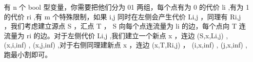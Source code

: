{}有\markdownRendererDollarSign{} n \markdownRendererDollarSign{}个\markdownRendererDollarSign{} bool \markdownRendererDollarSign{}型变量，你需要把他们分为\markdownRendererDollarSign{} 01 \markdownRendererDollarSign{}两组，每个点有为\markdownRendererDollarSign{} 0 \markdownRendererDollarSign{}的代价\markdownRendererDollarSign{} l\markdownRendererUnderscore{}i \markdownRendererDollarSign{},有为\markdownRendererDollarSign{} 1 \markdownRendererDollarSign{}的代价\markdownRendererDollarSign{} r\markdownRendererUnderscore{}i \markdownRendererDollarSign{},有\markdownRendererDollarSign{} m \markdownRendererDollarSign{}个特殊限制，如果\markdownRendererDollarSign{} i,j \markdownRendererDollarSign{}同时在左侧会产生代价\markdownRendererDollarSign{} L\markdownRendererUnderscore{}\markdownRendererLeftBrace{}i,j\markdownRendererRightBrace{} \markdownRendererDollarSign{}，同理有\markdownRendererDollarSign{} R\markdownRendererUnderscore{}\markdownRendererLeftBrace{}i,j\markdownRendererRightBrace{} \markdownRendererDollarSign{}，我们考虑建立源点\markdownRendererDollarSign{} S \markdownRendererDollarSign{}，汇点\markdownRendererDollarSign{} T \markdownRendererDollarSign{}，\markdownRendererDollarSign{} S \markdownRendererDollarSign{}向每个点连流量为\markdownRendererDollarSign{} l\markdownRendererUnderscore{}i \markdownRendererDollarSign{}的边，每个点向\markdownRendererDollarSign{} T \markdownRendererDollarSign{}连流量为\markdownRendererDollarSign{} r\markdownRendererUnderscore{}i \markdownRendererDollarSign{}的边。对于左侧代价\markdownRendererDollarSign{} L\markdownRendererUnderscore{}\markdownRendererLeftBrace{}i,j\markdownRendererRightBrace{} \markdownRendererDollarSign{},我们建立一个新点\markdownRendererDollarSign{} x \markdownRendererDollarSign{}，连边\markdownRendererDollarSign{} (S,x,L\markdownRendererUnderscore{}\markdownRendererLeftBrace{}i,j\markdownRendererRightBrace{}) \markdownRendererDollarSign{},\markdownRendererDollarSign{} (x,i,inf) \markdownRendererDollarSign{},\markdownRendererDollarSign{} (x,j,inf) \markdownRendererDollarSign{},对于右侧同理建新点\markdownRendererDollarSign{} x \markdownRendererDollarSign{}，连边\markdownRendererDollarSign{} (x,T,R\markdownRendererUnderscore{}\markdownRendererLeftBrace{}i,j\markdownRendererRightBrace{}) \markdownRendererDollarSign{}，\markdownRendererDollarSign{} (i,x,inf) \markdownRendererDollarSign{},\markdownRendererDollarSign{} (j,x,inf) \markdownRendererDollarSign{},跑最小割即可。\markdownRendererInterblockSeparator
{}
\markdownRendererSectionEnd 
\markdownRendererSectionEnd 
\markdownRendererSectionEnd 
\markdownRendererSectionEnd \markdownRendererSectionBegin
